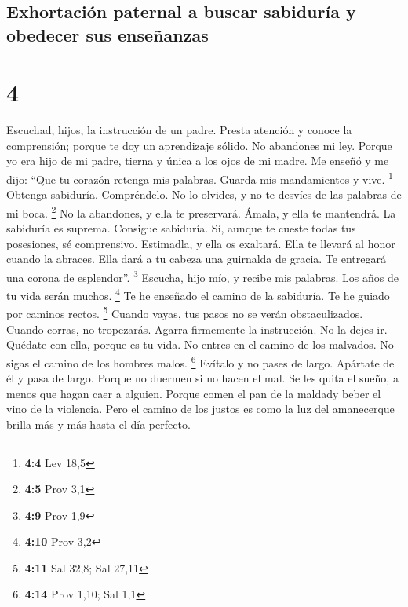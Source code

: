 \hypertarget{exhortaciuxf3n-paternal-a-buscar-sabiduruxeda-y-obedecer-sus-enseuxf1anzas}{%
\subsection{Exhortación paternal a buscar sabiduría y obedecer sus
enseñanzas}\label{exhortaciuxf3n-paternal-a-buscar-sabiduruxeda-y-obedecer-sus-enseuxf1anzas}}

\hypertarget{section-3}{%
\section{4}\label{section-3}}

 Escuchad, hijos, la instrucción de un padre. Presta
atención y conoce la comprensión;  porque te doy un
aprendizaje sólido. No abandones mi ley.  Porque yo era
hijo de mi padre, tierna y única a los ojos de mi madre. 
Me enseñó y me dijo: ``Que tu corazón retenga mis palabras. Guarda mis
mandamientos y vive. \footnote{\textbf{4:4} Lev 18,5} 
Obtenga sabiduría. Compréndelo. No lo olvides, y no te desvíes de las
palabras de mi boca. \footnote{\textbf{4:5} Prov 3,1}  No
la abandones, y ella te preservará. Ámala, y ella te mantendrá.
 La sabiduría es suprema. Consigue sabiduría. Sí, aunque
te cueste todas tus posesiones, sé comprensivo. 
Estimadla, y ella os exaltará. Ella te llevará al honor cuando la
abraces.  Ella dará a tu cabeza una guirnalda de gracia.
Te entregará una corona de esplendor''. \footnote{\textbf{4:9} Prov 1,9}
 Escucha, hijo mío, y recibe mis palabras. Los años de tu
vida serán muchos. \footnote{\textbf{4:10} Prov 3,2}  Te
he enseñado el camino de la sabiduría. Te he guiado por caminos rectos.
\footnote{\textbf{4:11} Sal 32,8; Sal 27,11}  Cuando
vayas, tus pasos no se verán obstaculizados. Cuando corras, no
tropezarás.  Agarra firmemente la instrucción. No la
dejes ir. Quédate con ella, porque es tu vida.  No entres
en el camino de los malvados. No sigas el camino de los hombres malos.
\footnote{\textbf{4:14} Prov 1,10; Sal 1,1}  Evítalo y no
pases de largo. Apártate de él y pasa de largo.  Porque
no duermen si no hacen el mal. Se les quita el sueño, a menos que hagan
caer a alguien.  Porque comen el pan de la maldady beber
el vino de la violencia.  Pero el camino de los justos es
como la luz del amanecerque brilla más y más hasta el día perfecto.
